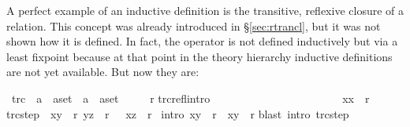 %
\begin{isabellebody}%
\def\isabellecontext{Star}%
%
%
\begin{isamarkuptext}%
A perfect example of an inductive definition is the transitive, reflexive
closure of a relation. This concept was already introduced in
\S\ref{sec:rtrancl}, but it was not shown how it is defined. In fact,
the operator \isa{{\isacharcircum}{\isacharasterisk}} is not defined inductively but via a least
fixpoint because at that point in the theory hierarchy
inductive definitions are not yet available. But now they are:%
\end{isamarkuptext}%
\ trc\ {\isacharcolon}{\isacharcolon}\ {\isachardoublequote}{\isacharparenleft}{\isacharprime}a\ {\isasymtimes}\ {\isacharprime}a{\isacharparenright}set\ {\isasymRightarrow}\ {\isacharparenleft}{\isacharprime}a\ {\isasymtimes}\ {\isacharprime}a{\isacharparenright}set{\isachardoublequote}\ \ {\isacharparenleft}{\isachardoublequote}{\isacharunderscore}{\isacharasterisk}{\isachardoublequote}\ {\isacharbrackleft}{}{}{}{}{\isacharbrackright}\ {}{}{}{\isacharparenright}\isanewline
{}\ {\isachardoublequote}r{\isacharasterisk}{\isachardoublequote}\isanewline
{}\isanewline
trc{\isacharunderscore}refl{\isacharbrackleft}intro{\isacharbang}{\isacharbrackright}{\isacharcolon}\ \ \ \ \ \ \ \ \ \ \ \ \ \ \ \ \ \ \ \ \ \ \ \ {\isachardoublequote}{\isacharparenleft}x{\isacharcomma}x{\isacharparenright}\ {\isasymin}\ r{\isacharasterisk}{\isachardoublequote}\isanewline
trc{\isacharunderscore}step{\isacharcolon}\ {\isachardoublequote}{\isasymlbrakk}\ {\isacharparenleft}x{\isacharcomma}y{\isacharparenright}\ {\isasymin}\ r{\isacharasterisk}{\isacharsemicolon}\ {\isacharparenleft}y{\isacharcomma}z{\isacharparenright}\ {\isasymin}\ r\ {\isasymrbrakk}\ {\isasymLongrightarrow}\ {\isacharparenleft}x{\isacharcomma}z{\isacharparenright}\ {\isasymin}\ r{\isacharasterisk}{\isachardoublequote}\isanewline
\isanewline
{}\ {\isacharbrackleft}intro{\isacharbrackright}{\isacharcolon}\ {\isachardoublequote}{\isacharparenleft}x{\isacharcomma}y{\isacharparenright}\ {\isacharcolon}\ r\ {\isasymLongrightarrow}\ {\isacharparenleft}x{\isacharcomma}y{\isacharparenright}\ {\isasymin}\ r{\isacharasterisk}{\isachardoublequote}\isanewline
{}blast\ intro{\isacharcolon}\ trc{\isacharunderscore}step{\isacharparenright}\isanewline
\isanewline

\end{isabellebody}
